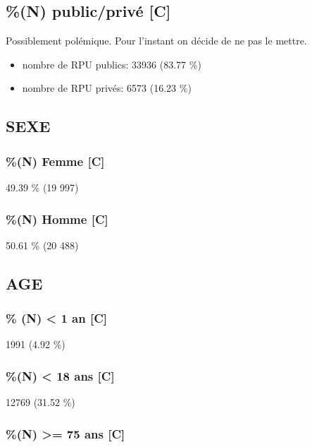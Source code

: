 \documentclass[]{article}
\begin{document}
\subsection{\%(N) public/privé {[}C{]}}\label{n-publicprive-c}

Possiblement polémique. Pour l'instant on décide de ne pas le mettre.

\begin{itemize}
\itemsep1pt\parskip0pt
\item
  nombre de RPU publics: 33936 (83.77 \%)
\item
  nombre de RPU privés: 6573 (16.23 \%)
\end{itemize}

\subsection{SEXE}\label{sexe}

\subsubsection{\%(N) Femme {[}C{]}}\label{n-femme-c}

49.39 \% (19 997)

\subsubsection{\%(N) Homme {[}C{]}}\label{n-homme-c}

50.61 \% (20 488)

\subsection{AGE}\label{age}

\subsubsection{\% (N) \textless{} 1 an {[}C{]}}\label{n-1-an-c}

1991 (4.92 \%)

\subsubsection{\%(N) \textless{} 18 ans {[}C{]}}\label{n-18-ans-c}

12769 (31.52 \%)

\subsubsection{\%(N) \textgreater{}= 75 ans {[}C{]}}\label{n-75-ans-c}
\end{document}
